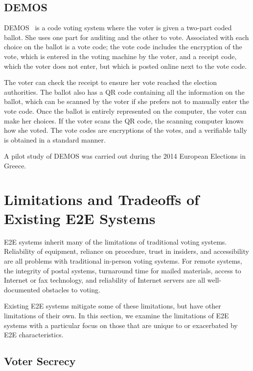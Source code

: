 \subsection{DEMOS}

DEMOS~\cite{kiayias2014} is a code voting system where the voter is
given a two-part coded ballot. She uses one part for auditing and the
other to vote. Associated with each choice on the ballot is a vote
code; the vote code includes the encryption of the vote, which is
entered in the voting machine by the voter, and a receipt code, which
the voter does not enter, but which is posted online next to the vote
code.

The voter can check the receipt to ensure her vote reached the
election authorities. The ballot also has a QR code containing all the
information on the ballot, which can be scanned by the voter if she
prefers not to manually enter the vote code. Once the ballot is
entirely represented on the computer, the voter can make her
choices. If the voter scans the QR code, the scanning computer knows
how she voted. The vote codes are encryptions of the votes, and a
verifiable tally is obtained in a standard manner.

A pilot study of DEMOS was carried out during the 2014 European
Elections in Greece.

\section{Limitations and Tradeoffs of Existing E2E Systems}
\label{sec:limit-exist-syst}

E2E systems inherit many of the limitations of traditional voting
systems. Reliability of equipment, reliance on procedure, trust in
insiders, and accessibility are all problems with traditional
in-person voting systems. For remote systems, the integrity of postal
systems, turnaround time for mailed materials, access to Internet or
fax technology, and reliability of Internet servers are all
well-documented obstacles to voting. 

Existing E2E systems mitigate some of these limitations, but have
other limitations of their own. In this section, we examine the
limitations of E2E systems with a particular focus on those that are
unique to or exacerbated by E2E characteristics.

\subsection{Voter Secrecy}

